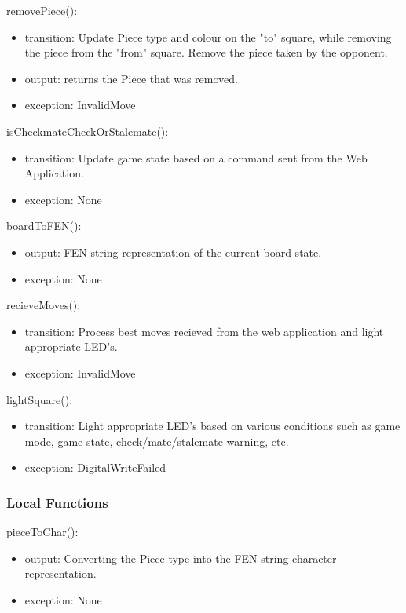 \documentclass[12pt, titlepage]{article}
\begin{document}
\noindent removePiece():
\begin{itemize}
\item transition: Update Piece type and colour on the "to" square, while removing the piece from the "from" square. Remove the piece taken by the opponent.
\item output: returns the Piece that was removed.
\item exception: InvalidMove
\end{itemize}

\noindent isCheckmateCheckOrStalemate():
\begin{itemize}
\item transition: Update game state based on a command sent from the Web Application.
\item exception: None
\end{itemize}

\noindent boardToFEN():
\begin{itemize}
\item output: FEN string representation of the current board state.
\item exception: None
\end{itemize}

\noindent recieveMoves():
\begin{itemize}
\item transition: Process best moves recieved from the web application and light appropriate LED's.
\item exception: InvalidMove
\end{itemize}

\noindent lightSquare():
\begin{itemize}
\item transition: Light appropriate LED's based on various conditions such as game mode, game state, check/mate/stalemate warning, etc.
\item exception: DigitalWriteFailed
\end{itemize}

\subsubsection{Local Functions}{
  \noindent pieceToChar():
  \begin{itemize}
  \item output: Converting the Piece type into the FEN-string character representation.
  \item exception: None
  \end{itemize}
}
\end{document}
